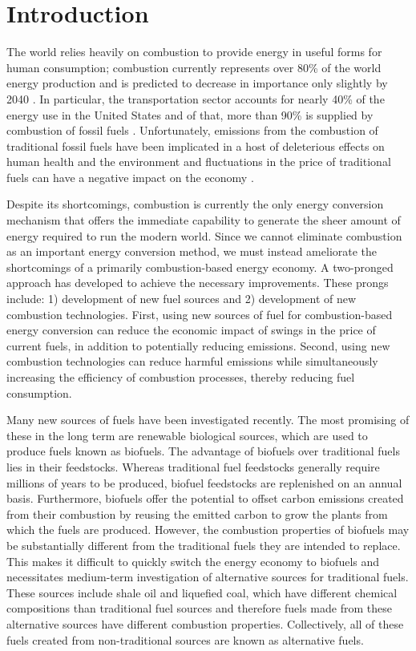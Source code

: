 \documentclass[12pt, letterpaper]{article}
\begin{document}
\section{Introduction}
\label{sec:intro-introduction}

The world relies heavily on combustion to provide energy in useful forms for 
human consumption; combustion currently represents over 80\% of the world 
energy production \cite{Sims2007} and is predicted to decrease in importance 
only slightly by 2040 \cite{EIA2013}. In particular, the transportation sector 
accounts for nearly 40\% of the energy use in the United States and of that, 
more than 90\% is supplied by combustion of fossil fuels \cite{MER2013}. 
Unfortunately, emissions from the combustion of traditional fossil fuels have 
been implicated in a host of deleterious effects on human health and the 
environment \cite{Avakian2002} and fluctuations in the price of traditional 
fuels can have a negative impact on the economy \cite{Owen2010}.

Despite its shortcomings, combustion is currently the only energy conversion 
mechanism that offers the immediate capability to generate the sheer amount 
of energy required to run the modern world. Since we cannot eliminate 
combustion as an important energy conversion method, we must instead ameliorate 
the shortcomings of a primarily combustion-based energy economy. A two-pronged 
approach has developed to achieve the necessary improvements. These prongs 
include: 1) development of new fuel sources and 2) development of new 
combustion technologies. First, using new sources of fuel for combustion-based 
energy conversion can reduce the economic impact of swings in the price of 
current fuels, in addition to potentially reducing emissions. Second, using new 
combustion technologies can reduce harmful emissions while simultaneously 
increasing the efficiency of combustion processes, thereby reducing fuel 
consumption.

Many new sources of fuels have been investigated recently. The most promising 
of these in the long term are renewable biological sources, which are used to 
produce fuels known as biofuels. The advantage of biofuels over traditional 
fuels lies in their feedstocks. Whereas traditional fuel feedstocks generally 
require millions of years to be produced, biofuel feedstocks are replenished 
on an annual basis. Furthermore, biofuels offer the potential to offset carbon 
emissions created from their combustion by reusing the emitted carbon to grow 
the plants from which the fuels are produced. However, the combustion 
properties of biofuels may be substantially different from the traditional 
fuels they are intended to replace. This makes it difficult to quickly switch 
the energy economy to biofuels and necessitates medium-term investigation of 
alternative sources for traditional fuels. These sources include shale oil and 
liquefied coal, which have different chemical compositions than traditional 
fuel sources and therefore fuels made from these alternative sources have 
different combustion properties. Collectively, all of these fuels created from 
non-traditional sources are known as alternative fuels. 
\end{document}
